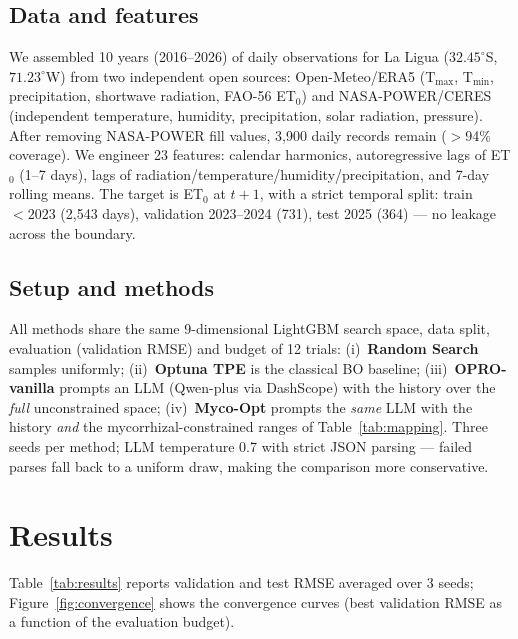 \documentclass[11pt]{article}
\begin{document}
\subsection{Data and features}
\label{sec:data}

We assembled 10 years (2016--2026) of daily observations for La Ligua
($32.45^\circ$S, $71.23^\circ$W) from two independent open sources:
Open-Meteo/ERA5 (T$_{\max}$, T$_{\min}$, precipitation, shortwave radiation,
FAO-56 ET$_0$) and NASA-POWER/CERES (independent temperature, humidity,
precipitation, solar radiation, pressure). After removing NASA-POWER fill
values, 3{,}900 daily records remain ($>$94\% coverage). We engineer 23
features: calendar harmonics, autoregressive lags of ET$_0$ (1--7 days), lags
of radiation/temperature/humidity/precipitation, and 7-day rolling means. The
target is ET$_0$ at $t{+}1$, with a strict temporal split: train $<2023$
(2{,}543 days), validation 2023--2024 (731), test 2025 (364) --- no leakage
across the boundary.

\subsection{Setup and methods}
\label{sec:setup}

All methods share the same 9-dimensional LightGBM search space, data split,
evaluation (validation RMSE) and budget of 12 trials: (i)~\textbf{Random
Search} samples uniformly; (ii)~\textbf{Optuna TPE} \citep{akiba2019} is the
classical BO baseline; (iii)~\textbf{OPRO-vanilla} \citep{yang2024opro} prompts
an LLM (Qwen-plus via DashScope) with the history over the \emph{full}
unconstrained space; (iv)~\textbf{Myco-Opt} prompts the \emph{same} LLM with
the history \emph{and} the mycorrhizal-constrained ranges of
Table~\ref{tab:mapping}. Three seeds per method; LLM temperature 0.7 with
strict JSON parsing --- failed parses fall back to a uniform draw, making the
comparison more conservative.

\section{Results}
\label{sec:results}

Table~\ref{tab:results} reports validation and test RMSE averaged over 3 seeds;
Figure~\ref{fig:convergence} shows the convergence curves (best validation RMSE
as a function of the evaluation budget).
\end{document}
